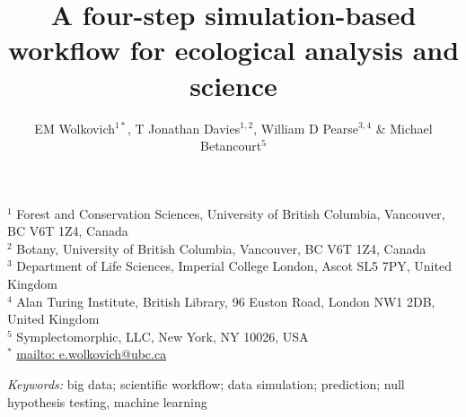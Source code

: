 \documentclass[11pt]{article}
\begin{document}

\renewcommand{\refname}{\CHead{}}


\title{A four-step simulation-based workflow for ecological analysis and science}
\author{EM Wolkovich$^{1*}$, T Jonathan Davies$^{1,2}$, William D Pearse$^{3,4}$ \& Michael Betancourt$^{5}$}
\maketitle

\noindent $^{1}$ Forest and Conservation Sciences, University of British Columbia, Vancouver, BC V6T 1Z4, Canada\\
$^{2}$ Botany, University of British Columbia, Vancouver, BC V6T 1Z4, Canada\\
$^{3}$ Department of Life Sciences, Imperial College London, Ascot SL5 7PY, United Kingdom \\
$^{4}$ Alan Turing Institute, British Library, 96 Euston Road, London NW1 2DB, United Kingdom \\
$^{5}$ Symplectomorphic, LLC, New York, NY 10026, USA \\
$^{*}$ \url{mailto: e.wolkovich@ubc.ca}
 
\vspace{3ex}
\noindent \emph{Keywords:} big data; scientific workflow; data simulation; prediction; null hypothesis testing, machine learning
\vspace{3ex}
\end{document}
